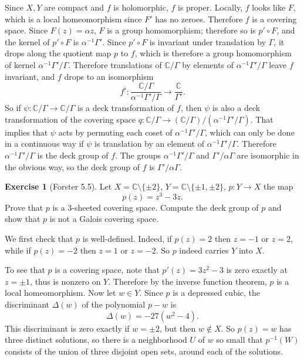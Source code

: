 \documentclass[10pt]{article}
\newcommand{\CC}{\mathbb{C}}
\theoremstyle{definition}
\newtheorem{exer}{Exercise}
\begin{document}
Since $X,Y$ are compact and $f$ is holomorphic, $f$ is proper.
Locally, $f$ looks like $F$, which is a local homeomorphism since $F'$ has no zeroes. Therefore $f$ is a covering space.
Since $F(z) = \alpha z$, $F$ is a group homomorphism; therefore so is $p' \circ F$, and the kernel of $p' \circ F$ is $\alpha^{-1}\Gamma'$.
Since $p' \circ F$ is invariant under translation by $\Gamma$, it drops along the quotient map $p$ to $f$, which is therefore a group homomorphism of kernel $\alpha^{-1}\Gamma'/\Gamma$.
Therefore translations of $\CC/\Gamma$ by elements of $\alpha^{-1}\Gamma'/\Gamma$ leave $f$ invariant, and $f$ drops to an isomorphism
$$f^\flat: \frac{\CC/\Gamma}{\alpha^{-1}\Gamma'/\Gamma} \to \frac{\CC}{\Gamma'}.$$
So if $\psi: \CC/\Gamma \to \CC/\Gamma$ is a deck transformation of $f$, then $\psi$ is also a deck transformation of the covering space $q: \CC/\Gamma \to (\CC/\Gamma)/(\alpha^{-1}\Gamma'/\Gamma)$.
That implies that $\psi$ acts by permuting each coset of $\alpha^{-1}\Gamma'/\Gamma$, which can only be done in a continuous way if $\psi$ is translation by an element of $\alpha^{-1}\Gamma'/\Gamma$.
Therefore $\alpha^{-1}\Gamma'/\Gamma$ is the deck group of $f$.
The groups $\alpha^{-1}\Gamma'/\Gamma$ and $\Gamma'/\alpha\Gamma$ are isomorphic in the obvious way, so the deck group of $f$ is $\Gamma'/\alpha\Gamma$.

\begin{exer}[Forster 5.5]
Let $X = \CC \setminus \{\pm 2\}$, $Y = \CC \setminus \{\pm 1, \pm 2\}$, $p: Y \to X$ the map
$$p(z) = z^3 - 3z.$$
Prove that $p$ is a $3$-sheeted covering space. Compute the deck group of $p$ and show that $p$ is not a Galois covering space.
\end{exer}

We first check that $p$ is well-defined. Indeed, if $p(z) = 2$ then $z = -1$ or $z = 2$, while if $p(z) = -2$ then $z = 1$ or $z = -2$.
So $p$ indeed carries $Y$ into $X$.

To see that $p$ is a covering space, note that $p'(z) = 3z^2 - 3$ is zero exactly at $z = \pm 1$, thus is nonzero on $Y$.
Therefore by the inverse function theorem, $p$ is a local homeomorphism.
Now let $w \in Y$.
Since $p$ is a depressed cubic, the discriminant $\Delta(w)$ of the polynomial $p - w$ is
$$\Delta(w) = -27(w^2 - 4).$$
This discriminant is zero exactly if $w = \pm 2$, but then $w \notin X$.
So $p(z) = w$ has three distinct solutions, so there is a neighborhood $U$ of $w$ so small that $p^{-1}(W)$ consists of the union of three disjoint open sets, around each of the solutions.
\end{document}
